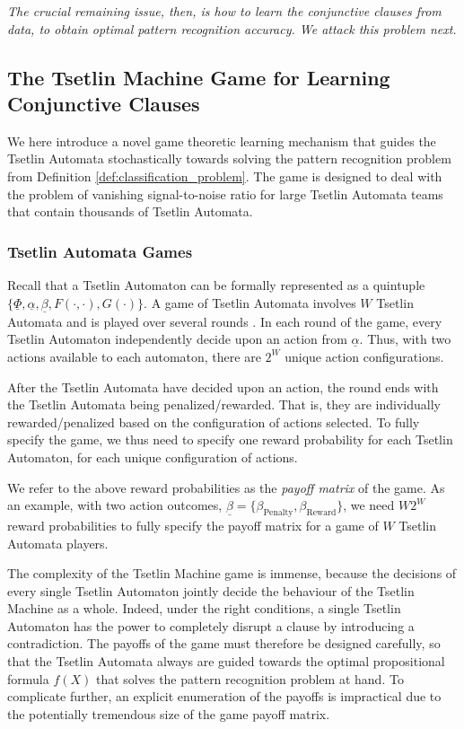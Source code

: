 \documentclass[11pt,a4paper]{article}
\begin{document}
\emph{The crucial remaining issue, then, is how to learn the conjunctive clauses from data, to obtain optimal pattern recognition accuracy. We attack this problem next.}

\subsection{The Tsetlin Machine Game for Learning Conjunctive Clauses}
\label{sec:tsetlin_machine_game}

We here introduce a novel game theoretic learning mechanism that guides the Tsetlin Automata stochastically towards solving the pattern recognition problem from Definition \ref{def:classification_problem}. The game is designed to deal with the problem of vanishing signal-to-noise ratio for large Tsetlin Automata teams that contain thousands of Tsetlin Automata.

\subsubsection{Tsetlin Automata Games}

Recall that a Tsetlin Automaton can be formally represented as a quintuple $\{\underline{\Phi}, \underline{\alpha}, \underline{\beta}, F(\cdot,\cdot), G(\cdot)\}$.
A game of Tsetlin Automata involves $W$ Tsetlin Automata and is played over several rounds \cite{Narendra1989}. In each round of the game, every Tsetlin Automaton independently decide upon an action from $\underline{\alpha}$. Thus, with two actions available to each automaton, there are $2^W$ unique action configurations.

After the Tsetlin Automata have decided upon an action, the round ends with the Tsetlin Automata being penalized/rewarded. That is, they are individually rewarded/penalized based on the configuration of actions selected. To fully specify the game, we thus need to specify one reward probability for each Tsetlin Automaton, for each unique configuration of actions.

We refer to the above reward probabilities as the \emph{payoff matrix} of the game. As an example, with two action outcomes, $\underline{\beta} = \{\beta_{\mathrm{Penalty}}, \beta_{\mathrm{Reward}}\}$, we need $W 2^W$ reward probabilities to fully specify the payoff matrix for a game of $W$ Tsetlin Automata players.

The complexity of the Tsetlin Machine game is immense, because the decisions of every single Tsetlin Automaton jointly decide the behaviour of the Tsetlin Machine as a whole. Indeed, under the right conditions, a single Tsetlin Automaton has the power to completely disrupt a clause by introducing a contradiction. The payoffs of the game must therefore be designed carefully, so that the Tsetlin Automata always are guided towards the optimal propositional formula $f(X)$ that solves the pattern recognition problem at hand. To complicate further, an explicit enumeration of the payoffs is impractical due to the potentially tremendous size of the game payoff matrix.
\end{document}
